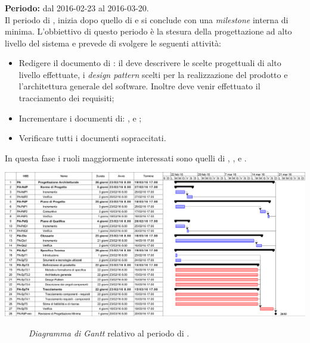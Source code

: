 \subsubsection{\PA}
\textbf{Periodo:} dal 2016-02-23 al 2016-03-20. \\
Il periodo di \PA, inizia dopo quello di \AD e si conclude con una \textit{milestone} interna di \RdP minima. L'obbiettivo di questo periodo è la stesura della progettazione ad alto livello del sistema e prevede di svolgere le seguenti attività:
\begin{itemize}
	\item Redigere il documento di \textit{\ST}: il \textit{\Prog} deve descrivere le scelte progettuali di alto livello effettuate, i \textit{design pattern} scelti per la realizzazione del prodotto e l'architettura generale del software. Inoltre deve venir effettuato il tracciamento dei requisiti;  
	\item Incrementare i documenti di: \textit{\NdP},\textit{\PdP} e \textit{\PdQ};
	\item Verificare tutti i documenti sopraccitati.
\end{itemize}
In questa fase i ruoli maggiormente interessati sono quelli di \textit{\Amm}, \textit{\Res}, \textit{\Prog} e \textit{\Ver}. 
\begin{center}
	\includegraphics[keepaspectratio = true, width=16cm]{immagini/PdP_ProgettazioneArchitetturaleGantt.png}
\end{center}
\begin{figure}[h]
	\caption{\textit{Diagramma di Gantt} relativo al periodo di \PA.}\label{etichetta}
\end{figure}

